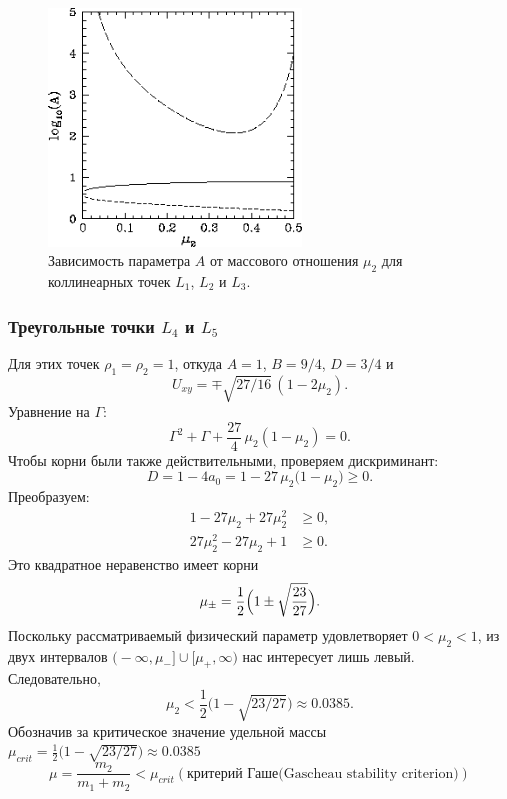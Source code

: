 \documentclass[12pt]{article}
\newcommand{\mutwo}{\mu_2}
\begin{document}
\begin{figure}[H]
  \centering
  \includegraphics[width=0.6\textwidth]{image2.png}
  \caption{Зависимость параметра $A$ от массового отношения $\mutwo$ для коллинеарных точек $L_1$, $L_2$ и $L_3$.}
  \label{fig:A_vs_mu}
\end{figure}

\subsubsection{Треугольные точки $L_4$ и $L_5$}
Для этих точек $\rho_1=\rho_2=1$, откуда $A=1$, $B=9/4$, $D=3/4$ и
\[U_{xy}=\mp\sqrt{27/16}\,(1-2\mutwo).\]
Уравнение на $\Gamma$:
\begin{equation}\tag{1116}
  \Gamma^{2}+\Gamma+\frac{27}{4}\,\mutwo(1-\mutwo)=0.
\end{equation}
Чтобы корни были также действительными, проверяем дискриминант:
\begin{equation}
D=1-4a_0=1-27\,\mu_2\bigl(1-\mu_2\bigr)\ge0.
\end{equation}
Преобразуем:
\begin{align}
1-27\mu_2+27\mu_2^2&\ge0,\\[2pt]
27\mu_2^2-27\mu_2+1&\ge0.
\end{align}
Это квадратное неравенство имеет корни
\[\mu_{\pm}=\frac12\Bigl(1\pm\sqrt{\frac{23}{27}}\Bigr).
\]
Поскольку рассматриваемый физический параметр удовлетворяет \(0<\mu_2<1\),
из двух интервалов
\(\bigl(-\infty,\mu_-\bigr]\cup\bigl[\mu_+,\infty\bigr)\)
нас интересует лишь левый.  Следовательно,
\begin{equation}\tag{1117}
  \mutwo<\frac12\bigl(1-\sqrt{23/27}\bigr)\approx0.0385.
\end{equation}
Обозначив за критическое значение удельной массы $\mu_{crit} = \frac12\bigl(1-\sqrt{23/27}\bigr)\approx0.0385$
\begin{equation}\tag{1118}
  \mu = \frac{m_2}{m_1+m_2}< \mu_{crit} (\text{критерий Гаше(Gascheau stability criterion)})
\end{equation}
\end{document}

